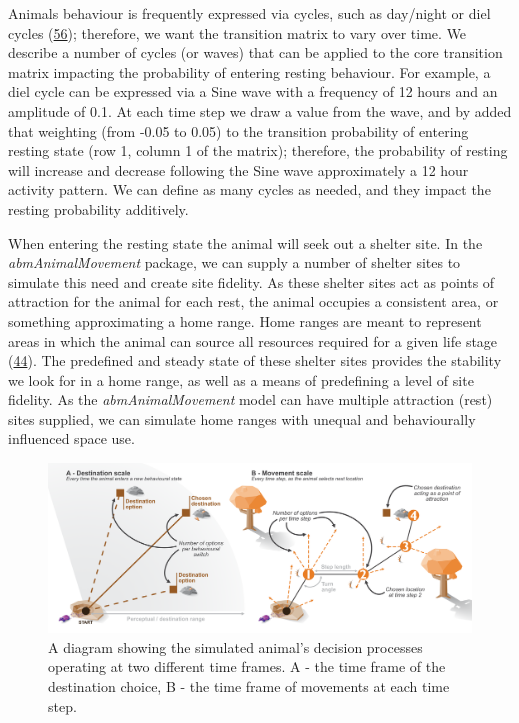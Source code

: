 \documentclass[10pt,a4paper]{article}
\begin{document}
Animals behaviour is frequently expressed via cycles, such as day/night or diel cycles (\protect\hyperlink{ref-rivera_rethinking_2022}{56}); therefore, we want the transition matrix to vary over time.
We describe a number of cycles (or waves) that can be applied to the core transition matrix impacting the probability of entering resting behaviour.
For example, a diel cycle can be expressed via a Sine wave with a frequency of 12 hours and an amplitude of 0.1.
At each time step we draw a value from the wave, and by added that weighting (from -0.05 to 0.05) to the transition probability of entering resting state (row 1, column 1 of the matrix); therefore, the probability of resting will increase and decrease following the Sine wave approximately a 12 hour activity pattern.
We can define as many cycles as needed, and they impact the resting probability additively.

When entering the resting state the animal will seek out a shelter site.
In the \emph{abmAnimalMovement} package, we can supply a number of shelter sites to simulate this need and create site fidelity.
As these shelter sites act as points of attraction for the animal for each rest, the animal occupies a consistent area, or something approximating a home range.
Home ranges are meant to represent areas in which the animal can source all resources required for a given life stage (\protect\hyperlink{ref-silva_autocorrelationinformed_2022}{44}).
The predefined and steady state of these shelter sites provides the stability we look for in a home range, as well as a means of predefining a level of site fidelity.
As the \emph{abmAnimalMovement} model can have multiple attraction (rest) sites supplied, we can simulate home ranges with unequal and behaviourally influenced space use.

\begin{figure}

{\centering \includegraphics[width=0.85\linewidth]{../ext_figures/Simulation Process Diagram Static} 

}

\caption{A diagram showing the simulated animal's decision processes operating at two different time frames. A - the time frame of the destination choice, B - the time frame of movements at each time step.}\label{fig:walkDiagram}
\end{figure}
\end{document}
